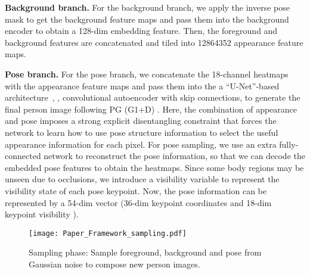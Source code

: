 \documentclass[10pt,twocolumn,letterpaper]{article}
\newcommand{\myparagraph}[1]{\vspace{0.0em}\noindent\textbf{#1}}
\begin{document}
\myparagraph{Background branch.} 
For the background branch, we apply the inverse pose mask to get the background feature maps and pass them into the background encoder to obtain a 128-dim embedding feature. 
Then, the foreground and background features are concatenated and tiled into 12864352 appearance feature maps.

\myparagraph{Pose branch.} 
For the pose branch, we concatenate the 18-channel heatmaps with the appearance feature maps and pass them into the a ``U-Net''-based architecture~\cite{U-net}, \ie, convolutional autoencoder with skip connections, to generate the final person image following PG (G1+D) \cite{PG2}. 
Here, the combination of appearance and pose imposes a strong explicit disentangling constraint that forces the network to learn how to use pose structure information to select the useful appearance information for each pixel.
For pose sampling, we use an extra fully-connected network to reconstruct the pose information, so that we can decode the embedded pose features to obtain the heatmaps.
Since some body regions may be unseen due to occlusions, we introduce a visibility variable  to represent the visibility state of each pose keypoint. 
Now, the pose information can be represented by a 54-dim vector (36-dim keypoint coordinates  and 18-dim keypoint visibility ).

\begin{figure*}[htp]
  \centering
  \texttt{[image: Paper\_Framework\_sampling.pdf]}\\
\vspace{-1mm}
  \caption{Sampling phase: Sample foreground, background and pose from Gaussian noise to compose new person images. }
\vspace{-2mm}
\label{fig:Paper_Framework_sampling}
\end{figure*}
\end{document}
